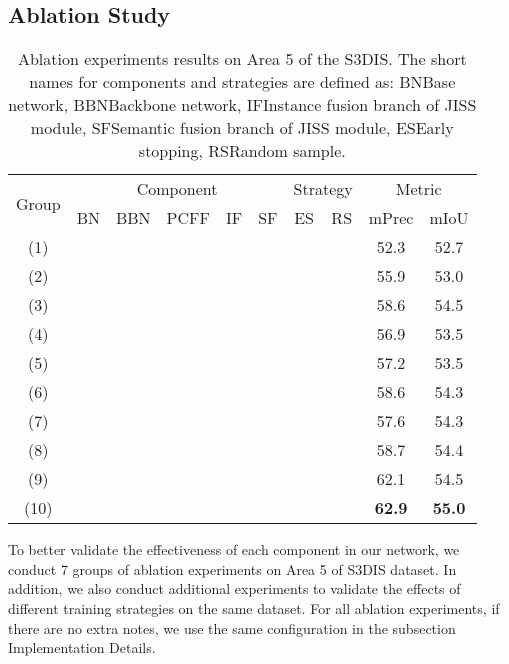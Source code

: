 \documentclass[letterpaper]{article} \usepackage{aaai20}  \usepackage{times}  \usepackage{helvet} \usepackage{courier}  \usepackage[hyphens]{url}  \usepackage{graphicx} \urlstyle{rm} \def\UrlFont{\rm}  \usepackage{graphicx}  \frenchspacing  \setlength{\pdfpagewidth}{8.5in}  \setlength{\pdfpageheight}{11in}
\begin{document}
\subsection{Ablation Study}
\begin{table}[t]
	\caption{Ablation experiments results on Area 5 of the S3DIS. The short names for components and strategies are defined as: BNBase network, BBNBackbone network, IFInstance fusion branch of JISS module, SFSemantic fusion branch of JISS module, ESEarly stopping, RSRandom sample.}
	\smallskip
	\centering
	\resizebox{.95\linewidth}{!}
	{
		\smallskip
		\begin{tabular}{c|ccccc|cc|c|c}
			\hline
			\multirow{2}{*}{Group} & \multicolumn{5}{c|}{Component} & \multicolumn{2}{c|}{Strategy} & \multicolumn{2}{c}{Metric} \\
			\cline{2-10}
			~ & BN & BBN & PCFF & IF & SF & ES & RS & mPrec  & mIoU \\
			\hline
			(1) &  & ~       & ~       & ~       & ~       & ~       & ~       & 52.3  & 52.7 \\
			(2) & ~       &  & ~       & ~       & ~       & ~       & ~       & 55.9  & 53.0 \\
			(3) & ~       &  &  & ~       & ~       & ~       & ~       & 58.6  & 54.5 \\
			(4) & ~       &  & ~       &  & ~       & ~       & ~       & 56.9  & 53.5 \\
			(5) & ~       &  & ~       & ~       &  & ~       & ~       & 57.2  & 53.5 \\
			(6) & ~       &  & ~       &  &  & ~       & ~       & 58.6  & 54.3 \\
			(7) & ~       &  &  &  &  & ~       & ~       & 57.6  & 54.3 \\
			(8) & ~       &  &  &  &  &  & ~       & 58.7  & 54.4 \\
			(9) & ~       &  &  &  &  & ~       &  & 62.1  & 54.5 \\
			(10) & ~      &  &  &  &  &  &  & \textbf{62.9} & \textbf{55.0} \\
			\hline
		\end{tabular}
	}
	\label{tab:s3dis_ablation_module}
\end{table}

To better validate the effectiveness of each component in our network, we conduct 7 groups of ablation experiments on Area 5 of S3DIS dataset. In addition, we also conduct additional experiments to validate the effects of different training strategies on the same dataset. For all ablation experiments, if there are no extra notes, we use the same configuration in the subsection Implementation Details. 
\end{document}
